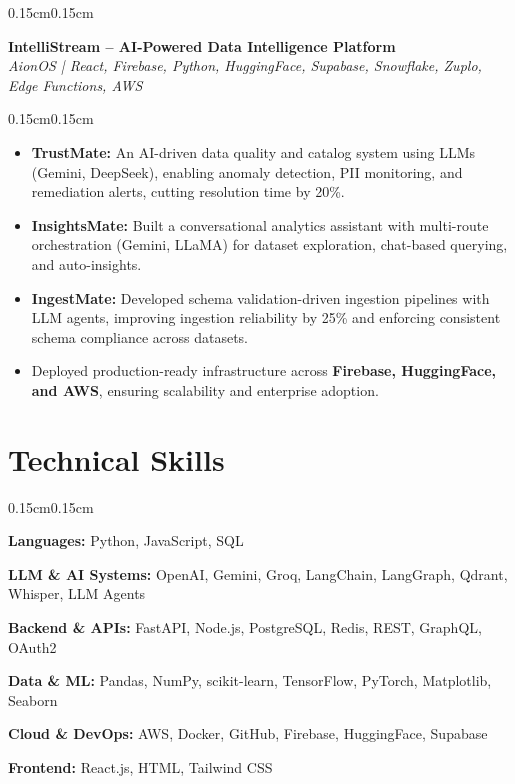 \documentclass[10pt, letterpaper]{article}
\newenvironment{highlights}{
\begin{itemize}[leftmargin=0.35cm, itemsep=1pt, topsep=1pt, parsep=0pt]
}{
\end{itemize}
}
\newenvironment{onecolentry}{
\begin{adjustwidth}{0.15cm}{0.15cm}
}{
\end{adjustwidth}
}
\begin{document}
\begin{onecolentry}
    \textbf{IntelliStream -- AI-Powered Data Intelligence Platform}\\
{\small\textit{AionOS | React, Firebase, Python, HuggingFace, Supabase, Snowflake, Zuplo, Edge Functions, AWS}}
\end{onecolentry}
\begin{onecolentry}
\begin{highlights}
\item \textbf{TrustMate:} An AI-driven data quality and catalog system using LLMs (Gemini, DeepSeek), enabling anomaly detection, PII monitoring, and remediation alerts, cutting resolution time by 20\%.  
\item \textbf{InsightsMate:} Built a conversational analytics assistant with multi-route orchestration (Gemini, LLaMA) for dataset exploration, chat-based querying, and auto-insights.
\item \textbf{IngestMate:} Developed schema validation-driven ingestion pipelines with LLM agents, improving ingestion reliability by 25\% and enforcing consistent schema compliance across datasets.  
\item Deployed production-ready infrastructure across \textbf{Firebase, HuggingFace, and AWS}, ensuring scalability and enterprise adoption. 
\end{highlights}
\end{onecolentry}

\vspace{0.2 cm}

\section{Technical Skills}
\begin{onecolentry}
\textbf{Languages:} Python, JavaScript, SQL\par
\textbf{LLM \& AI Systems:} OpenAI, Gemini, Groq, LangChain, LangGraph, Qdrant, Whisper, LLM Agents\par
\textbf{Backend \& APIs:} FastAPI, Node.js, PostgreSQL, Redis, REST, GraphQL, OAuth2\par
\textbf{Data \& ML:} Pandas, NumPy, scikit-learn, TensorFlow, PyTorch, Matplotlib, Seaborn\par
\textbf{Cloud \& DevOps:} AWS, Docker, GitHub, Firebase, HuggingFace, Supabase\par
\textbf{Frontend:} React.js, HTML, Tailwind CSS
\end{onecolentry}
\end{document}
